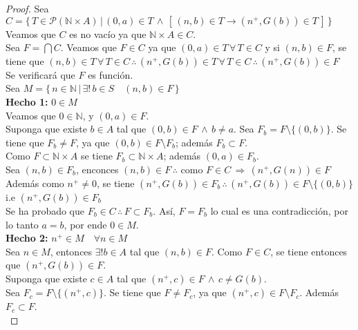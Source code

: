     \begin{proof}
        Sea $C = \{ \, T \in  \mathcal{P}(\mathbb{N} \times A) \, | \, (0,a) \in
        T \, \land \, [\,(n,b) \in T \rightarrow (n^+, G(b))\in T \,]\, \}$
        Veamos que $C$ es no vacío ya que $\mathbb{N}\times A \in C$. \\
        Sea $F = \bigcap C$. Veamos que $F \in C$ ya que $(0,a) \in T \, \forall \,
        T \in C$ y si $(n,b) \in F$, se tiene que $(n, b) \in T \, \forall \,T
        \in C \, \therefore \, (n^+, G(b)) \in T \, \forall \, T \in C \,
        \therefore \, (n^+, G(b))\in F$ \\
        Se verificará que $F$ es función. \\
        Sea $M= \{\, n\in \mathbb{N} \, | \, \exists ! \, b\in S \quad (n,b) \in F
        \, \}$ \\
        \textbf{Hecho 1:} $0 \in M$ \\
        Veamos que $0 \in \mathbb{N}$, y $(0,a) \in F$. \\
        Suponga que existe $b \in A$ tal que  $(0,b) \in F \, \land \, b \neq
        a$. Sea $F_b = F \setminus \{(0,b)\}$. Se tiene que $F_b \neq F$, ya que
        $(0,b) \in F\setminus F_b$; además $F_b \subset F$. \\
        Como $F \subset \mathbb{N} \times A$ se tiene $F_b \subset \mathbb{N}
        \times A$; además $(0,a) \in F_b$. \\
        Sea $(n,b) \in F_b$, enconces $(n,b) \in F \, \therefore$ como $F \in C
        \, \Rightarrow \, (n^+, G(n))\in F$ Además como $n^+ \neq 0$, se tiene
        $(n^+, G(b))\in F_b\, \therefore \, (n^+, G(b))\in F \setminus
        \{(0,b)\}$ i.e $(n^+, G(b))\in F_b$ \\
        Se ha probado que $F_b \in C \, \therefore \, F\subset F_b$. Así,
        $F=F_b$ lo cual es una contradicción, por lo tanto $a=b$, por ende $0
        \in M$. \\
        \textbf{Hecho 2:} $n^+ \in M \quad \forall n \in M$ \\
        Sea $n \in M$, entonces $\exists ! b\in A$ tal que $(n,b) \in F$. Como
        $F \in C$, se tiene entonces que $(n^+, G(b))\in F$. \\
        Suponga que existe $c \in A$ tal que $(n^+, c)\in F \, \land \, c \neq
        G(b)$. \\
        Sea $F_c = F \setminus \{(n^+, c)\}$. Se tiene que $F \neq F_c$, ya que
        $(n^+, c) \in F \setminus F_c$. Además $F_c \subset F$. \\

\end{proof}

